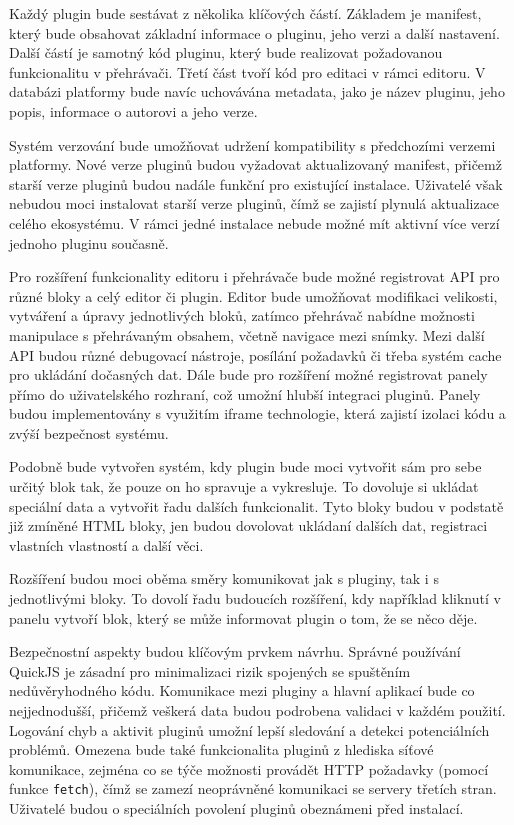 Každý plugin bude sestávat z několika klíčových částí. 
Základem je manifest, který bude obsahovat základní informace o pluginu, jeho verzi a další nastavení. 
Další částí je samotný kód pluginu, který bude realizovat požadovanou funkcionalitu v přehrávači. 
Třetí část tvoří kód pro editaci v rámci editoru. 
V databázi platformy bude navíc uchovávána metadata, jako je název pluginu, jeho popis, informace o autorovi a jeho verze.

Systém verzování bude umožňovat udržení kompatibility s předchozími verzemi platformy. 
Nové verze pluginů budou vyžadovat aktualizovaný manifest, přičemž starší verze pluginů budou nadále funkční pro existující instalace. 
Uživatelé však nebudou moci instalovat starší verze pluginů, čímž se zajistí plynulá aktualizace celého ekosystému.
V rámci jedné instalace nebude možné mít aktivní více verzí jednoho pluginu současně.

Pro rozšíření funkcionality editoru i přehrávače bude možné registrovat API pro různé bloky a celý editor či plugin.
Editor bude umožňovat modifikaci velikosti, vytváření a úpravy jednotlivých bloků, zatímco přehrávač nabídne možnosti manipulace s přehrávaným obsahem, včetně navigace mezi snímky.
Mezi další API budou různé debugovací nástroje, posílání požadavků či třeba systém cache pro ukládání dočasných dat.
Dále bude pro rozšíření možné registrovat panely přímo do uživatelského rozhraní, což umožní hlubší integraci pluginů.
Panely budou implementovány s využitím iframe technologie, která zajistí izolaci kódu a zvýší bezpečnost systému.

Podobně bude vytvořen systém, kdy plugin bude moci vytvořit sám pro sebe určitý blok tak, že pouze on ho spravuje a vykresluje.
To dovoluje si ukládat speciální data a vytvořit řadu dalších funkcionalit.
Tyto bloky budou v podstatě již zmíněné HTML bloky, jen budou dovolovat ukládaní dalších dat, registraci vlastních vlastností a další věci.

Rozšíření budou moci oběma směry komunikovat jak s pluginy, tak i s jednotlivými bloky.
To dovolí řadu budoucích rozšíření, kdy například kliknutí v panelu vytvoří blok, který se může informovat plugin o tom, že se něco děje.

Bezpečnostní aspekty budou klíčovým prvkem návrhu.
Správné používání QuickJS je zásadní pro minimalizaci rizik spojených se spuštěním nedůvěryhodného kódu.
Komunikace mezi pluginy a hlavní aplikací bude co nejjednodušší, přičemž veškerá data budou podrobena validaci v každém použití.
Logování chyb a aktivit pluginů umožní lepší sledování a detekci potenciálních problémů.
Omezena bude také funkcionalita pluginů z hlediska síťové komunikace, zejména co se týče možnosti provádět HTTP požadavky (pomocí funkce \texttt{fetch}), čímž se zamezí neoprávněné komunikaci se servery třetích stran.
Uživatelé budou o speciálních povolení pluginů obeznámeni před instalací.

